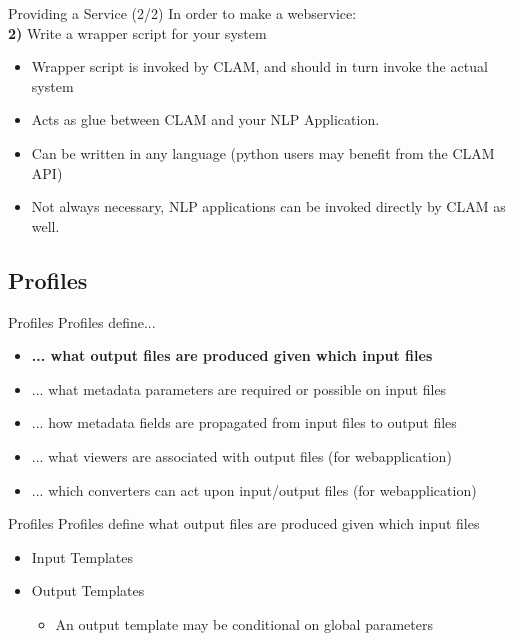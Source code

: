 \documentclass[compress]{beamer}
\begin{document}
\begin{frame}
    \begin{block}{Providing a Service (2/2)}
        In order to make a webservice: \\
        \textbf{2)} Write a wrapper script for your system
        \begin{itemize}
            \item Wrapper script is invoked by CLAM, and should in turn invoke the actual system
            \item Acts as glue between CLAM and your NLP Application.
            \item Can be written in any language (python users may benefit from the CLAM API)
            \item Not always necessary, NLP applications can be invoked directly by CLAM as well.
        \end{itemize}
    
    \end{block}

\end{frame}

\subsection{Profiles}

\begin{frame}
    \begin{block}{Profiles}    
        Profiles define...
        \begin{itemize}
            \item \textbf{... what output files are produced given which input files}
            \item ... what metadata parameters are required or possible on input files
            \item ... how metadata fields are propagated from input files to output files
            \item ... what viewers are associated with output files (for webapplication)
            \item ... which converters can act upon input/output files (for webapplication)
        \end{itemize}        
    \end{block}
\end{frame}

\begin{frame}
    \begin{block}{Profiles}    
        Profiles define what output files are produced given which input files
        \begin{itemize}
            \item Input Templates
            \item Output Templates
            \begin{itemize}
                \item An output template may be conditional on global parameters
            \end{itemize}
        \end{itemize}        
    \end{block}
    
\end{frame}
\end{document}
